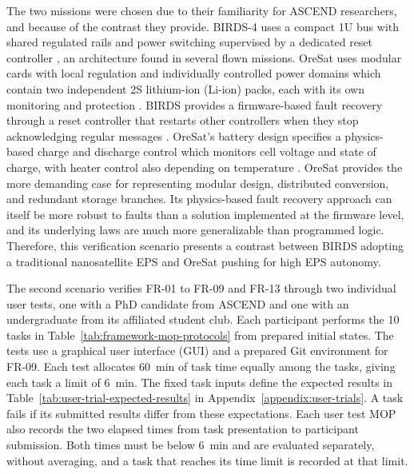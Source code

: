 The two missions were chosen due to their familiarity for ASCEND researchers, and because of the contrast they provide.
BIRDS-4 uses a compact 1U bus with shared regulated rails and power switching supervised by a dedicated reset controller \citep{shrestha2021birdssafety,kim2021birdsbus}, an architecture found in several flown missions.
OreSat uses modular cards with local regulation and individually controlled power domains which contain two independent 2S lithium-ion (Li-ion) packs, each with its own monitoring and protection \citep{greenberg2021oresat,oresat2025batterydesign}.
BIRDS provides a firmware-based fault recovery through a reset controller that restarts other controllers when they stop acknowledging regular messages \citep[Sec.~4.3]{kim2021birdsbus}.
OreSat's battery design specifies a physics-based charge and discharge control which monitors cell voltage and state of charge, with heater control also depending on temperature \citep{oresat2025batterydesign}.
OreSat provides the more demanding case for representing modular design, distributed conversion, and redundant storage branches.
Its physics-based fault recovery approach can itself be more robust to faults than a solution implemented at the firmware level, and its underlying laws are much more generalizable than programmed logic.
Therefore, this verification scenario presents a contrast between BIRDS adopting a traditional nanosatellite EPS and OreSat pushing for high EPS autonomy.

The second scenario verifies FR-01 to FR-09 and FR-13 through two individual user tests, one with a PhD candidate from ASCEND and one with an undergraduate from its affiliated student club.
Each participant performs the 10 tasks in Table~\ref{tab:framework-mop-protocols} from prepared initial states.
The tests use a graphical user interface (GUI) and a prepared Git environment for FR-09.
Each test allocates 60~min of task time equally among the tasks, giving each task a limit of 6~min.
The fixed task inputs define the expected results in Table~\ref{tab:user-trial-expected-results} in Appendix~\ref{appendix:user-trials}.
A task fails if its submitted results differ from these expectations.
Each user test MOP also records the two elapsed times from task presentation to participant submission.
Both times must be below 6~min and are evaluated separately, without averaging, and a task that reaches its time limit is recorded at that limit.

